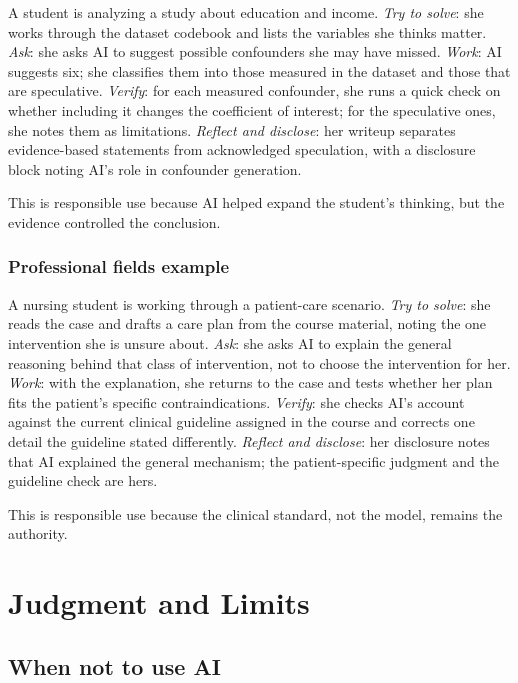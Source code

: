 \documentclass{SIAMbook2023}
\begin{document}
A student is analyzing a study about education and income. \emph{Try to solve}: she works through the dataset codebook and lists the variables she thinks matter. \emph{Ask}: she asks AI to suggest possible confounders she may have missed. \emph{Work}: AI suggests six; she classifies them into those measured in the dataset and those that are speculative. \emph{Verify}: for each measured confounder, she runs a quick check on whether including it changes the coefficient of interest; for the speculative ones, she notes them as limitations. \emph{Reflect and disclose}: her writeup separates evidence-based statements from acknowledged speculation, with a disclosure block noting AI's role in confounder generation.

This is responsible use because AI helped expand the student's thinking, but the evidence controlled the conclusion.

\subsection{Professional fields example}
\label{subsec:professional-example}

A nursing student is working through a patient-care scenario. \emph{Try to solve}: she reads the case and drafts a care plan from the course material, noting the one intervention she is unsure about. \emph{Ask}: she asks AI to explain the general reasoning behind that class of intervention, not to choose the intervention for her. \emph{Work}: with the explanation, she returns to the case and tests whether her plan fits the patient's specific contraindications. \emph{Verify}: she checks AI's account against the current clinical guideline assigned in the course and corrects one detail the guideline stated differently. \emph{Reflect and disclose}: her disclosure notes that AI explained the general mechanism; the patient-specific judgment and the guideline check are hers.

This is responsible use because the clinical standard, not the model, remains the authority.

\chapter{Judgment and Limits}
\label{ch:judgment-and-limits}%

\section{When not to use AI}
\label{sec:when-not-to-use}%
\end{document}
